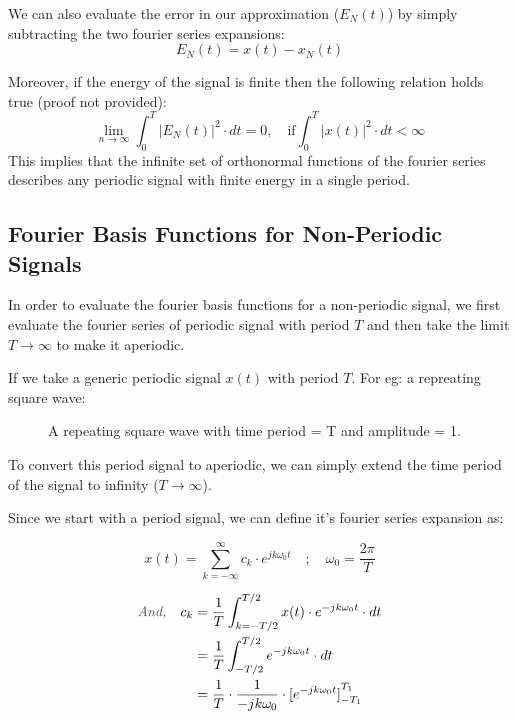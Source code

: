 \documentclass[letterpaper,12pt]{article}
\newcommand{\annot}[1]{\textcolor{darkgray}{\textit{#1}}}
\begin{document}
We can also evaluate the error in our approximation ($E_{N}(t)$) by simply
subtracting the two fourier series expansions:
\[E_{N}(t) = x(t) - x_{N}(t)\]

Moreover, if the energy of the signal is finite then the following relation
holds true (proof not provided):
\begin{equation}
    \lim_{n \rightarrow \infty} \int_{0}^{T} {|E_{N}(t)|}^{2}\cdot dt = 0, \quad \text{if} \int_{0}^{T} {|x(t)|}^{2}\cdot dt < \infty
    \label{eq:fourier_series_approximation_error}
\end{equation}
This implies that the infinite set of orthonormal functions of the fourier series describes any periodic signal with finite energy in a single period.

\subsection{Fourier Basis Functions for Non-Periodic Signals}
In order to evaluate the fourier basis functions for a non-periodic signal, we
first evaluate the fourier series of periodic signal with period $T$ and then
take the limit $T \to \infty$ to make it aperiodic.

If we take a generic periodic signal $x(t)$ with period $T$. For eg: a
repreating square wave:

\begin{figure}[!ht]
    \centering
    
    \caption{A repeating square wave with time period = T and amplitude = 1.}\label{fig:repeating_square_wave}
\end{figure}

To convert this period signal to aperiodic, we can simply extend the time
period of the signal to infinity ($T \to \infty$).

Since we start with a period signal, we can define it's fourier series
expansion as:

\[x(t) = \sum_{k=-\infty}^{\infty} c_{k} \cdot e^{j k \omega_{0} t} \quad ;  \quad \omega_{0} = \frac{2\pi}{T}\]

\begin{align*}
    \annot{And,} \quad  c_{k} & = \frac{1}{T} \int_{k=-T/2}^{T/2} x(t) \cdot e^{-jk\omega_{0}t} \cdot dt                  \\
                              & = \frac{1}{T} \int_{-T/2}^{T/2} e^{-jk\omega_{0}t} \cdot dt                               \\
                              & = \frac{1}{T} \cdot \frac{1}{-jk \omega_{0}} \cdot {[e^{-jk \omega_{0}t}]}_{-T_{1}}^{T_1}
\end{align*}
\end{document}

